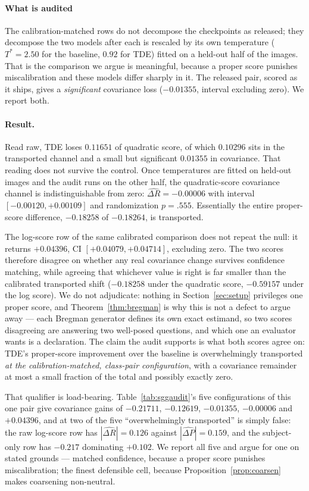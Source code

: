 \paragraph{What is audited} The calibration-matched rows do not decompose the checkpoints as
released; they decompose the two models after each is rescaled by its own temperature
($T^*=2.50$ for the baseline, $0.92$ for TDE) fitted on a held-out half of the images. That
is the comparison we argue is meaningful, because a proper score punishes miscalibration and
these models differ sharply in it. The released pair, scored as it ships, gives a
\emph{significant} covariance loss ($-0.01355$, interval excluding zero). We report both.

\paragraph{Result.} Read raw, TDE loses $0.11651$ of quadratic score, of which $0.10296$ sits
in the transported channel and a small but significant $0.01355$ in covariance. That reading
does not survive the control. Once temperatures are fitted on held-out images and the audit
runs on the other half, the quadratic-score covariance channel is indistinguishable from
zero: $\widehat{\Delta R}=-0.00006$ with interval $[-0.00120,+0.00109]$ and randomization
$p=.555$. Essentially the entire proper-score difference, $-0.18258$ of $-0.18264$, is
transported.

The log-score row of the same calibrated comparison does not repeat the null: it returns
$+0.04396$, CI $[+0.04079,+0.04714]$, excluding zero. The two scores therefore disagree on
whether any real covariance change survives confidence matching, while agreeing that
whichever value is right is far smaller than the calibrated transported shift ($-0.18258$
under the quadratic score, $-0.59157$ under the log score). We do not adjudicate: nothing in
Section~\ref{sec:setup} privileges one proper score, and
Theorem~\ref{thm:bregman} is why this is not a defect to argue away --- each Bregman generator defines its own exact estimand,
so two scores disagreeing are answering two well-posed questions, and which one an evaluator
wants is a declaration. The claim the audit supports is what both scores agree on: TDE's
proper-score improvement over the baseline is overwhelmingly transported \emph{at the
calibration-matched, class-pair configuration}, with a covariance remainder at most a small
fraction of the total and possibly exactly zero.

That qualifier is load-bearing. Table~\ref{tab:sggaudit}'s five configurations of this one
pair give covariance gains of $-0.21711$, $-0.12619$, $-0.01355$, $-0.00006$ and $+0.04396$,
and at two of the five ``overwhelmingly transported'' is simply false: the raw log-score row
has $|\widehat{\Delta R}|=0.126$ against $|\widehat{\Delta P}|=0.159$, and the subject-only
row has $-0.217$ dominating $+0.102$. We report all five and argue for one on stated grounds
--- matched confidence, because a proper score punishes miscalibration; the finest defensible
cell, because Proposition~\ref{prop:coarsen} makes coarsening non-neutral.

